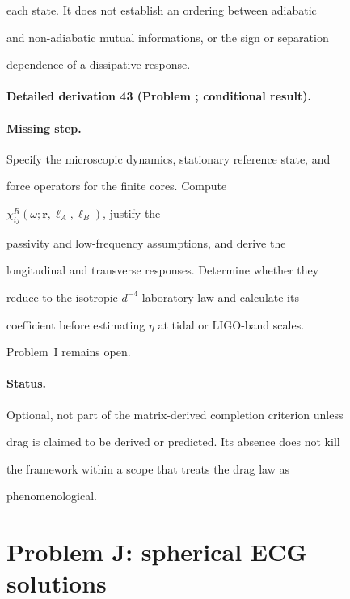 each state. It does not establish an ordering between adiabatic

and non-adiabatic mutual informations, or the sign or separation

dependence of a dissipative response.



\paragraph{Detailed derivation 43 (Problem ; conditional result).} \label{ref:detail-42} %



\paragraph{Missing step.}

Specify the microscopic dynamics, stationary reference state, and

force operators for the finite cores. Compute

\(\chi^R_{ij}(\omega;\mathbf r,\ell_A,\ell_B)\), justify the

passivity and low-frequency assumptions, and derive the

longitudinal and transverse responses. Determine whether they

reduce to the isotropic \(d^{-4}\) laboratory law and calculate its

coefficient before estimating \(\eta\) at tidal or LIGO-band scales.

Problem~I remains open.



\paragraph{Status.}

Optional, not part of the matrix-derived completion criterion unless

drag is claimed to be derived or predicted. Its absence does not kill

the framework within a scope that treats the drag law as

phenomenological.



\section{Problem J: spherical ECG solutions}

